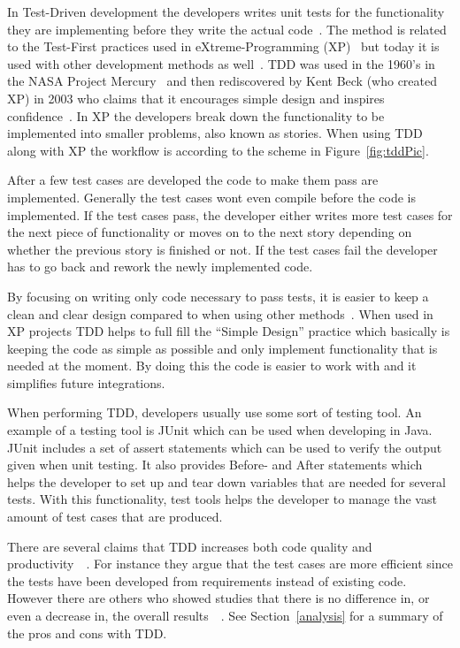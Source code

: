 In Test-Driven development the developers writes unit tests for the functionality they are implementing before they write the actual code~\cite{beckTestDriven}. The method is related to the Test-First practices used in eXtreme-Programming (XP)~\cite{beckXP} but today it is used with other development methods as well~\cite{MSNET}. TDD was used in the 1960’s in the NASA Project Mercury~\cite{NASA} and then rediscovered by Kent Beck (who created XP) in 2003 who claims that it encourages simple design and inspires confidence~\cite{beckXP}. In XP the developers break down the functionality to be implemented into smaller problems, also known as stories. When using TDD along with XP the workflow is according to the scheme in Figure~\ref{fig:tddPic}. 

After a few test cases are developed the code to make them pass are implemented. Generally the test cases wont even compile before the code is implemented. If the test cases pass, the developer either writes more test cases for the next piece of functionality or moves on to the next story depending on whether the previous story is finished or not. If the test cases fail the developer has to go back and rework the newly implemented code.


By focusing on writing only code necessary to pass tests, it is easier to keep a clean and clear design compared to when using other methods~\cite{beckXP}. When used in XP projects TDD helps to full fill the “Simple Design” practice which basically is keeping the code as simple as possible and only implement functionality that is needed at the moment. By doing this the code is easier to work with and it simplifies future integrations. 


When performing TDD, developers usually use some sort of testing tool. An example of a testing tool is JUnit which can be used when developing in Java. JUnit includes a set of assert statements which can be used to verify the output given when unit testing. It also provides Before- and After statements which helps the developer to set up and tear down variables that are needed for several tests. With this functionality, test tools helps the developer to manage the vast amount of test cases that are produced.


There are several claims that TDD increases both code quality and productivity~\cite{beckXP}~\cite{erdogmus}. For instance they argue that the test cases are more efficient since the tests have been developed from requirements instead of existing code. However there are others who showed studies that there is no difference in, or even a decrease in, the overall results~\cite{tddInvest}~\cite{mullerandhagner}. See Section~\ref{analysis} for a summary of the pros and cons with TDD.